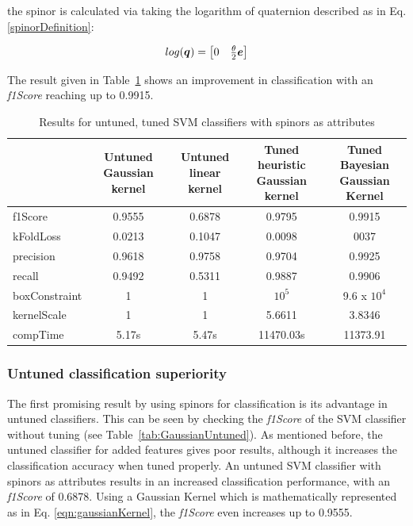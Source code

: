 the spinor is calculated via taking the logarithm of quaternion described as in Eq. \ref{spinorDefinition}:

\begin{equation}{\label{spinorDefinition}}
log(\bm{q}) = \begin{bmatrix} 
0 & \frac{\theta}{2} \bm{e} \\
\end{bmatrix}
\end{equation}

The result given in Table~\ref{tab:spinorsGaussian} shows an improvement in classification with an \emph{f1Score} reaching up to 0.9915.

\begin{table}[hbt!]
\caption{\label{tab:spinorsGaussian} Results for untuned, tuned SVM classifiers with spinors as attributes}
\centering
\begin{tabular}{lcccc}
\hline
& \makecell{Untuned \\ Gaussian kernel} & \makecell{Untuned \\ linear kernel} & \makecell{Tuned heuristic \\ Gaussian kernel}& \makecell{Tuned Bayesian \\ Gaussian Kernel}\\\hline
f1Score& 0.9555 & 0.6878 & 0.9795 & 0.9915\\
kFoldLoss & 0.0213 & 0.1047 & 0.0098 & 0037 \\
precision& 0.9618 & 0.9758 & 0.9704 & 0.9925\\
recall& 0.9492 & 0.5311 & 0.9887 & 0.9906\\
boxConstraint& 1 & 1 & $10^{5}$ & 9.6 x $10^{4}$ \\
kernelScale& 1 & 1 & 5.6611 & 3.8346 \\
compTime & 5.17s& 5.47s &11470.03s& 11373.91\\
\hline
\end{tabular}
\end{table}

\subsubsection{Untuned classification superiority}

The first promising result by using spinors for classification is its advantage in untuned classifiers. This can be seen by checking the \emph{f1Score} of the SVM classifier without tuning (see Table~\ref{tab:GaussianUntuned}). As mentioned before, the untuned classifier for added features gives poor results, although it increases the classification accuracy when tuned properly. An untuned SVM classifier with spinors as attributes results in an increased classification performance, with an \emph{f1Score} of 0.6878. Using a Gaussian Kernel which is mathematically represented as in Eq. \ref{eqn:gaussianKernel}, the \emph{f1Score} even increases up to 0.9555.

